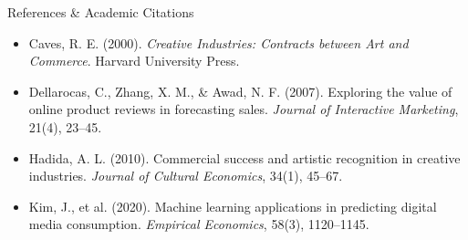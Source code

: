 \documentclass[aspectratio=169,11pt]{beamer}
\begin{document}
\begin{frame}{References \& Academic Citations}
  \footnotesize
  \begin{itemize}\setlength{\itemsep}{.8em}
    \item Caves, R. E. (2000). \textit{Creative Industries: Contracts between
      Art and Commerce}. Harvard University Press.
    \item Dellarocas, C., Zhang, X. M., \& Awad, N. F. (2007). Exploring the
      value of online product reviews in forecasting sales.
      \textit{Journal of Interactive Marketing}, 21(4), 23--45.
    \item Hadida, A. L. (2010). Commercial success and artistic recognition
      in creative industries. \textit{Journal of Cultural Economics}, 34(1),
      45--67.
    \item Kim, J., et al. (2020). Machine learning applications in predicting
      digital media consumption. \textit{Empirical Economics}, 58(3),
      1120--1145.
  \end{itemize}
\end{frame}
\end{document}
